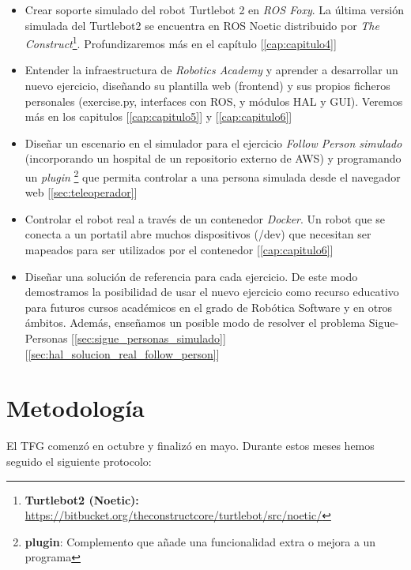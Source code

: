 \begin{itemize}
	\item Crear soporte simulado del robot Turtlebot 2 en \textit{ROS Foxy}. La última versión simulada del Turtlebot2 se encuentra en ROS Noetic distribuido por \textit{The Construct}\footnote{\textbf{Turtlebot2 (Noetic):} \url{https://bitbucket.org/theconstructcore/turtlebot/src/noetic/}}. Profundizaremos más en el capítulo [\ref{cap:capitulo4}]
	\item Entender la infraestructura de \textit{Robotics Academy} y aprender a desarrollar un nuevo ejercicio, diseñando su plantilla web (frontend) y sus propios ficheros personales (exercise.py, interfaces con ROS, y módulos HAL y GUI). Veremos más en los capitulos [\ref{cap:capitulo5}] y [\ref{cap:capitulo6}]
	\item Diseñar un escenario en el simulador para el ejercicio \textit{Follow Person simulado} (incorporando un hospital de un repositorio externo de AWS) y programando un \textit{plugin} \footnote{\textbf{plugin}: Complemento que añade una funcionalidad extra o mejora a un programa} que permita controlar a una persona simulada desde el navegador web [\ref{sec:teleoperador}]
	\item Controlar el robot real a través de un contenedor \textit{Docker}. Un robot que se conecta a un portatil abre muchos dispositivos (/dev) que necesitan ser mapeados para ser utilizados por el contenedor [\ref{cap:capitulo6}]
	\item Diseñar una solución de referencia para cada ejercicio. De este modo demostramos la posibilidad de usar el nuevo ejercicio como recurso educativo para futuros cursos académicos en el grado de Robótica Software y en otros ámbitos. Además, enseñamos un posible modo de resolver el problema Sigue-Personas [\ref{sec:sigue_personas_simulado}] [\ref{sec:hal_solucion_real_follow_person}]
\end{itemize}



\section{Metodología}
\label{sec:metodologia}
El TFG comenzó en octubre y finalizó en mayo. Durante estos meses hemos seguido el siguiente protocolo:

